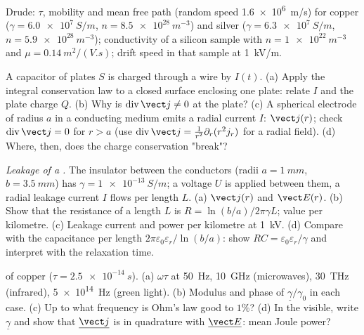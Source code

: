 \begin{exercise}[$\star$]\label{exo:b2:charges-currents-conduction:4}
Drude: $\tau$, mobility and mean free path (random speed \qty{1.6e6}{m/s})
for copper ($\gamma = \qty{6.0e7}{S/m}$, $n = \qty{8.5e28}{m^{-3}}$) and silver
($\gamma = \qty{6.3e7}{S/m}$, $n = \qty{5.9e28}{m^{-3}}$); conductivity of a
silicon sample with $n = \qty{1e22}{m^{-3}}$ and $\mu = \qty{0.14}{m^2/(V.s)}$;
drift speed in that sample at \qty{1}{kV/m}.
\end{exercise}

\begin{exercise}[$\star\star$]\label{exo:b2:charges-currents-conduction:5}
A capacitor of plates $S$ is charged through a wire by $I(t)$. (a) Apply
the integral conservation law to a closed surface enclosing one plate:
relate $I$ and the plate charge $Q$. (b) Why is $\operatorname{div}\vect j \ne 0$
at the plate? (c) A spherical electrode of radius $a$ in a conducting
medium emits a radial current $I$: $\vect j(r)$; check $\operatorname{div}
\vect j = 0$ for $r > a$ (use $\operatorname{div}\vect j = \frac1{r^2}\partial_r(r^2j_r)$
for a radial field). (d) Where, then, does the charge conservation
"break"?
\end{exercise}

\begin{exercise}[$\star\star$]\label{exo:b2:charges-currents-conduction:6}
\emph{Leakage of a .} The insulator between the conductors
(radii $a = \qty{1}{mm}$, $b = \qty{3.5}{mm}$) has $\gamma = \qty{1e-13}{S/m}$; a
voltage $U$ is applied between them, a radial leakage current $I$ flows
per length $L$. (a) $\vect j(r)$ and $\vect E(r)$. (b) Show that the
resistance of a length $L$ is $R = \ln(b/a)/2\pi\gamma L$; value per
kilometre. (c) Leakage current and power per kilometre at \qty{1}{kV}.
(d) Compare with the capacitance per length $2\pi\varepsilon_0\varepsilon_r/\ln(b/a)$:
show $RC = \varepsilon_0\varepsilon_r/\gamma$ and interpret with the relaxation time.
\end{exercise}

\begin{exercise}[$\star\star$]\label{exo:b2:charges-currents-conduction:7}
 of copper ($\tau = \qty{2.5e-14}{s}$). (a) $\omega\tau$ at
\qty{50}{Hz}, \qty{10}{GHz} (microwaves), \qty{30}{THz} (infrared), \qty{5e14}{Hz}
(green light). (b) Modulus and phase of $\underline\gamma/\gamma_0$ in each case.
(c) Up to what frequency is Ohm's law good to $1\%$? (d) In the visible,
write $\underline\gamma$ and show that $\underline{\vect j}$ is in quadrature with
$\underline{\vect E}$: mean Joule power?
\end{exercise}

